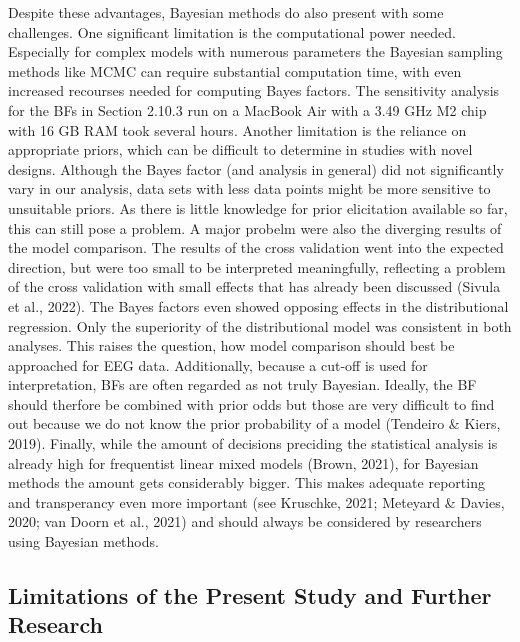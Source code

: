 \documentclass[
  doc,12pt,floatsintext]{apa7}
\begin{document}
Despite these advantages, Bayesian methods do also present with some challenges. One significant limitation is the computational power needed. Especially for complex models with numerous parameters the Bayesian sampling methods like MCMC can require substantial computation time, with even increased recourses needed for computing Bayes factors. The sensitivity analysis for the BFs in Section 2.10.3 run on a MacBook Air with a 3.49 GHz M2 chip with 16 GB RAM took several hours. Another limitation is the reliance on appropriate priors, which can be difficult to determine in studies with novel designs. Although the Bayes factor (and analysis in general) did not significantly vary in our analysis, data sets with less data points might be more sensitive to unsuitable priors. As there is little knowledge for prior elicitation available so far, this can still pose a problem. A major probelm were also the diverging results of the model comparison. The results of the cross validation went into the expected direction, but were too small to be interpreted meaningfully, reflecting a problem of the cross validation with small effects that has already been discussed (Sivula et al., 2022). The Bayes factors even showed opposing effects in the distributional regression. Only the superiority of the distributional model was consistent in both analyses. This raises the question, how model comparison should best be approached for EEG data. Additionally, because a cut-off is used for interpretation, BFs are often regarded as not truly Bayesian. Ideally, the BF should therfore be combined with prior odds but those are very difficult to find out because we do not know the prior probability of a model (Tendeiro \& Kiers, 2019). Finally, while the amount of decisions preciding the statistical analysis is already high for frequentist linear mixed models (Brown, 2021), for Bayesian methods the amount gets considerably bigger. This makes adequate reporting and transperancy even more important (see Kruschke, 2021; Meteyard \& Davies, 2020; van Doorn et al., 2021) and should always be considered by researchers using Bayesian methods.

\subsection{Limitations of the Present Study and Further Research}\label{limitations-of-the-present-study-and-further-research}
\end{document}
